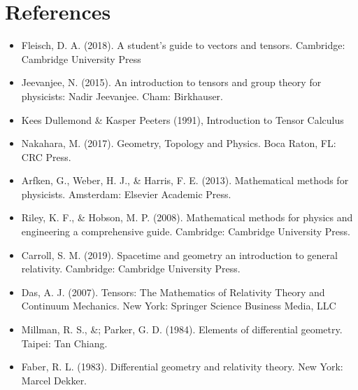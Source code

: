 \documentclass[a4paper,12pt]{book}
\begin{document}
\chapter*{References}
\begin{itemize}
	\item Fleisch, D. A. (2018). A student's guide to vectors and tensors. Cambridge: Cambridge University Press
	\item Jeevanjee, N. (2015). An introduction to tensors and group theory for physicists: Nadir Jeevanjee. Cham: Birkhauser.
	\item Kees Dullemond \& Kasper Peeters (1991), Introduction to Tensor Calculus 
	\item Nakahara, M. (2017). Geometry, Topology and Physics. Boca Raton, FL: CRC Press.
	\item Arfken, G., Weber, H. J., \& Harris, F. E. (2013). Mathematical methods for physicists. Amsterdam: Elsevier Academic Press.
	\item  Riley, K. F., \& Hobson, M. P. (2008). Mathematical methods for physics and engineering a comprehensive guide. Cambridge: Cambridge University Press.
	\item Carroll, S. M. (2019). Spacetime and geometry an introduction to general relativity. Cambridge: Cambridge University Press.
	\item Das, A. J. (2007). Tensors: The Mathematics of Relativity Theory and Continuum Mechanics. New York: Springer Science Business Media, LLC
	\item Millman, R. S., \&; Parker, G. D. (1984). Elements of differential geometry. Taipei: Tan Chiang.
	\item Faber, R. L. (1983). Differential geometry and relativity theory. New York: Marcel Dekker.	
\end{itemize}

\backmatter
\end{document}
